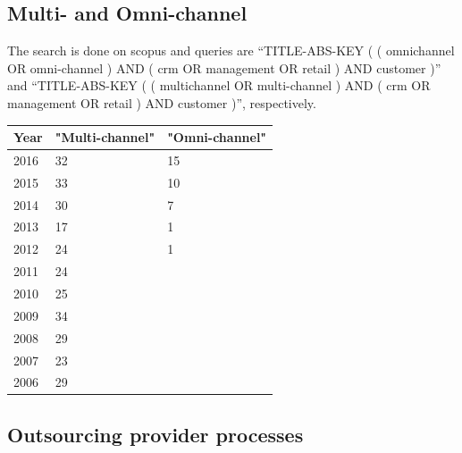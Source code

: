 \subsection{Multi- and Omni-channel}
\label{app:mcoc}
The search is done on scopus and queries are \enquote{TITLE-ABS-KEY ( ( omnichannel  OR  omni-channel )  AND  ( crm  OR  management  OR  retail )  AND  customer )} and \enquote{TITLE-ABS-KEY ( ( multichannel  OR  multi-channel )  AND  ( crm  OR  management  OR  retail )  AND  customer )}, respectively.

\begin{table}[caption={multi- and omni-channel publication comparison}, label=tab:crmnotioncomparison]
	\centering
	\begin{tabular}{p{1cm}| p{4cm} |p{4cm}    } 
	\textbf{Year} & \textbf{"Multi-channel"} & \textbf{"Omni-channel"} \\ \hline 
	2016          & 32            & 15                                                                       \\
	2015          & 33            & 10                                                                   \\
	2014          & 30            & 7                                                                   \\
	2013          & 17            & 1                                                           \\
	2012          & 24            & 1                                                              \\
	2011          & 24            &                                                       \\
	2010          & 25            &                                                                \\
	2009          & 34            &                                                       \\
	2008          & 29             &                                             \\
	2007          & 23            &                                                       \\
	2006 & 29         &                           					 \\
\end{tabular}
\end{table}


\subsection{Outsourcing provider processes}
\label{app:provproc}

